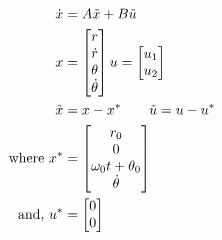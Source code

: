 \documentclass{article}
\begin{document}
\begin{align}
    \dot{x} &= A\Tilde{x} + B\Tilde{u} \\
    x &= \begin{bmatrix}r \\ \dot{r} \\ \theta \\ \dot{\theta} \end{bmatrix} 
    u = \begin{bmatrix}u_1 \\ u_2    \end{bmatrix} \\
    \Tilde{x} &= x - x^* \quad \quad \Tilde{u} = u - u^* \\
    \textrm{where } x^* &= \begin{bmatrix}r_0 \\ 0 \\ \omega_0t + \theta_0 \\
    \dot{\theta} \end{bmatrix}  \\
    \textrm{and, } u^* &= \begin{bmatrix}0 \\ 0    \end{bmatrix} 
\end{align}
\end{document}
